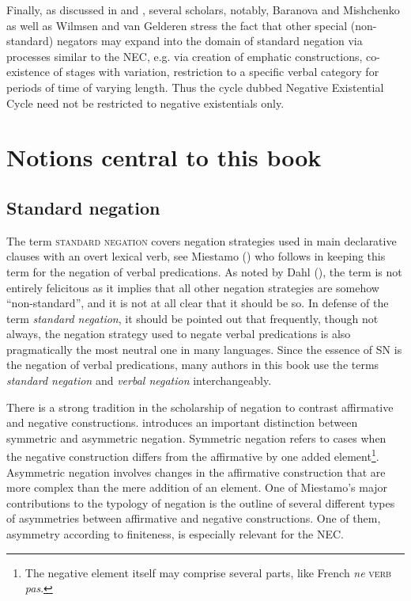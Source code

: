 \documentclass[output=paper,chinesefont,colorlinks,citecolor=brown]{langscibook}
\begin{document}
 Finally, as discussed in  and , several scholars, notably, Baranova and Mishchenko as well as Wilmsen and van Gelderen stress the fact that other special (non-standard) negators may expand into the domain of standard negation via processes similar to the NEC, e.g. via creation of emphatic constructions, co-existence of stages with variation, restriction to a specific verbal category for periods of time of varying length. Thus the cycle dubbed Negative Existential Cycle need not be restricted to negative existentials only.

\section{Notions central to this book}\label{sect:notions}\label{sec:intro:2}
\subsection{Standard negation}\label{sect:sn}\label{sec:intro:2.1}
The term \textsc{standard negation} covers negation strategies used in main declarative clauses with an overt lexical verb, see Miestamo (\citeyear[1]{Miestamo2005}) who follows \citet{payne1985a} in keeping this term for the negation of verbal predications. As noted by Dahl (\citeyear[10--11]{Dahl2010}), the term is not entirely felicitous as it implies that all other negation strategies are somehow “non-standard”, and it is not at all clear that it should be so. In defense of the term \textit{standard negation}, it should be pointed out that frequently, though not always, the negation strategy used to negate verbal predications is also pragmatically the most neutral one in many languages. Since the essence of  SN is the negation of verbal predications, many authors in this book use the terms \textit{standard negation} and \textit{verbal negation} interchangeably.

There is a strong tradition in the scholarship of negation to contrast affirmative and negative constructions. \citet[6--7]{Miestamo2005} introduces an important distinction between symmetric and asymmetric negation. Symmetric negation refers to cases when the negative construction differs from the affirmative by one added element\footnote{The negative element itself may comprise several parts, like French \textit{ne} \textsc{verb} \textit{pas}.}. Asymmetric negation involves changes in the affirmative construction that are more complex than the mere addition of an element. One of Miestamo’s major contributions to the typology of negation is the outline of several different types of asymmetries between affirmative and negative constructions. One of them, asymmetry according to finiteness, is especially relevant for the NEC.
\end{document}
